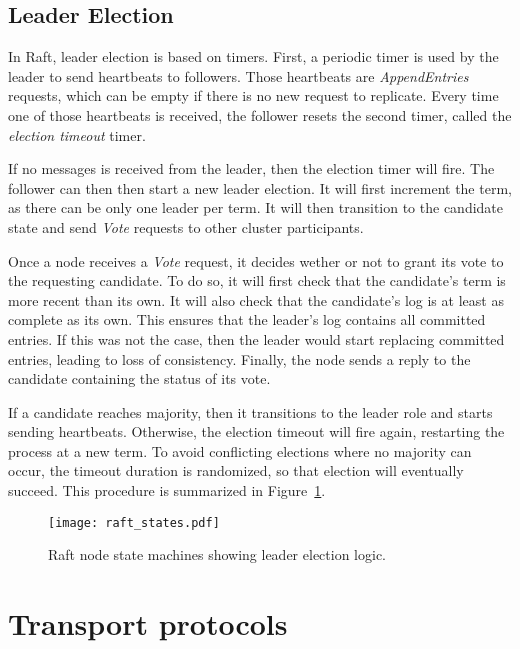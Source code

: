 \subsection{Leader Election}

In Raft, leader election is based on timers.
First, a periodic timer is used by the leader to send heartbeats to followers.
Those heartbeats are \emph{AppendEntries} requests, which can be empty if there is no new request to replicate.
Every time one of those heartbeats is received, the follower resets the second timer, called the \emph{election timeout} timer.

If no messages is received from the leader, then the election timer will fire.
The follower can then then start a new leader election.
It will first increment the term, as there can be only one leader per term.
It will then transition to the candidate state and send \emph{Vote} requests to other cluster participants.

Once a node receives a \emph{Vote} request, it decides wether or not to grant its vote to the requesting candidate.
To do so, it will first check that the candidate's term is more recent than its own.
It will also check that the candidate's log is at least as complete as its own.
This ensures that the leader's log contains all committed entries.
If this was not the case, then the leader would start replacing committed entries, leading to loss of consistency.
Finally, the node sends a reply to the candidate containing the status of its vote.

If a candidate reaches majority, then it transitions to the leader role and starts sending heartbeats.
Otherwise, the election timeout will fire again, restarting the process at a new term.
To avoid conflicting elections where no majority can occur, the timeout duration is randomized, so that election will eventually succeed.
This procedure is summarized in Figure~\ref{fig:raft-leader-election}.


\begin{figure}
    \centering
    \texttt{[image: raft\_states.pdf]}
    \caption{Raft node state machines showing leader election logic.
    \label{fig:raft-leader-election}
    }
\end{figure}


\section{Transport protocols}


